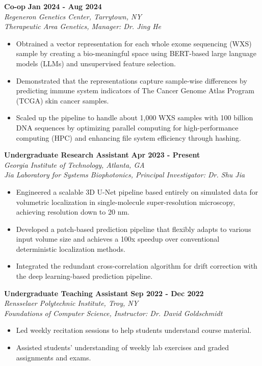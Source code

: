 \documentclass[letterpaper, 10pt]{article}
\newcommand{\subsectionvspace}{\vspace{6pt}}
\begin{document}
    \subsectionvspace
    
    \textbf{Co-op} \hfill 
    \textbf{Jan 2024 - Aug 2024} \\
    \textit{Regeneron Genetics Center, Tarrytown, NY} \\
    \textit{Therapeutic Area Genetics, Manager: Dr. Jing He}
    \begin{itemize}
        \item Obtrained a vector representation for each whole exome sequencing (WXS) sample by creating a bio-meaningful space using BERT-based large language models (LLMs) and unsupervised feature selection.
        \item Demonstrated that the representations capture sample-wise differences by predicting immune system indicators of The Cancer Genome Atlas Program (TCGA) skin cancer samples.
        \item Scaled up the pipeline to handle about 1,000 WXS samples with 100 billion DNA sequences by optimizing parallel computing for high-performance computing (HPC) and enhancing file system efficiency through hashing.
    \end{itemize}

    \subsectionvspace

    \textbf{Undergraduate Research Assistant} \hfill 
    \textbf{Apr 2023 - Present} \\
    \textit{Georgia Institute of Technology, Atlanta, GA} \\
    \textit{Jia Laboratory for Systems Biophotonics, Principal Investigator: Dr. Shu Jia}
    \begin{itemize}
        \item Engineered a scalable 3D U-Net pipeline based entirely on simulated data for volumetric localization in single-molecule super-resolution microscopy, achieving resolution down to 20 nm.
        \item Developed a patch-based prediction pipeline that flexibly adapts to various input volume size and achieves a 100x speedup over conventional deterministic localization methods.
        \item Integrated the redundant cross-correlation algorithm for drift correction with the deep learning-based prediction pipeline.
    \end{itemize}

    \subsectionvspace

    \textbf{Undergraduate Teaching Assistant} \hfill 
    \textbf{Sep 2022 - Dec 2022} \\
    \textit{Rensselaer Polytechnic Institute, Troy, NY} \\
    \textit{Foundations of Computer Science, Instructor: Dr. David Goldschmidt}
    \begin{itemize}
        \item Led weekly recitation sessions to help students understand course material.
        \item Assisted students' understanding of weekly lab exercises and graded assignments and exams. 
    \end{itemize}
\end{document}
